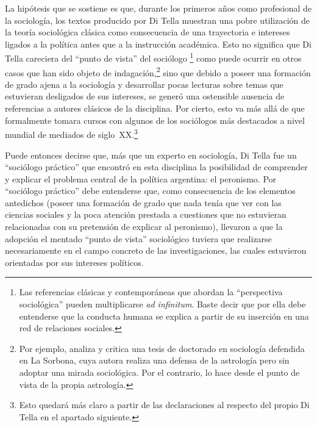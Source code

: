 La hipótesis que se sostiene es que, durante los primeros años como profesional de la sociología, los textos producido por Di Tella muestran una pobre utilización de la teoría sociológica clásica como consecuencia de una trayectoria e intereses ligados a la política antes que a la instrucción académica. Esto no significa que Di Tella careciera del \enquote{punto de vista} del sociólogo \parencite{1516-ALEXANDER2008,1522-BAUMAN2007,1696-LAHIRE2016}\footnote{Las referencias clásicas y contemporáneas que abordan la \enquote{perspectiva sociológica} pueden multiplicarse \emph{ad infinitum}. Baste decir que por ella debe entenderse que la conducta humana se explica a partir de su inserción en una red de relaciones sociales.} como puede ocurrir en otros casos que han sido objeto de indagación,\footnote{Por ejemplo, \textcite[329-363]{1697-LAHIRE2006} analiza y critica una tesis de doctorado en sociología defendida en La Sorbona, cuya autora realiza una defensa de la astrología pero sin adoptar una mirada sociológica. Por el contrario, lo hace desde el punto de vista de la propia astrología.} sino que debido a poseer una formación de grado ajena a la sociología y desarrollar pocas lecturas sobre temas que estuvieran desligados de sus intereses, se generó una ostensible ausencia de referencias a autores clásicos de la disciplina. Por cierto, esto va más allá de que formalmente tomara cursos con algunos de los sociólogos más destacados a nivel mundial de mediados de siglo~XX.\footnote{Esto quedará más claro a partir de las declaraciones al respecto del propio Di Tella en el apartado siguiente.}

Puede entonces decirse que, más que un experto en sociología, Di Tella fue un \enquote{sociólogo práctico} que encontró en esta disciplina la posibilidad de comprender y explicar el problema central de la política argentina: el peronismo. Por \enquote{sociólogo práctico} debe entenderse que, como consecuencia de los elementos antedichos (poseer una formación de grado que nada tenía que ver con las ciencias sociales  y la poca atención prestada a cuestiones que no estuvieran relacionadas con su pretensión de explicar  al peronismo), llevaron a que la adopción el mentado \enquote{punto de vista} sociológico tuviera que realizarse necesariamente en el campo concreto de las investigaciones, las cuales estuvieron orientadas por sus intereses políticos.

